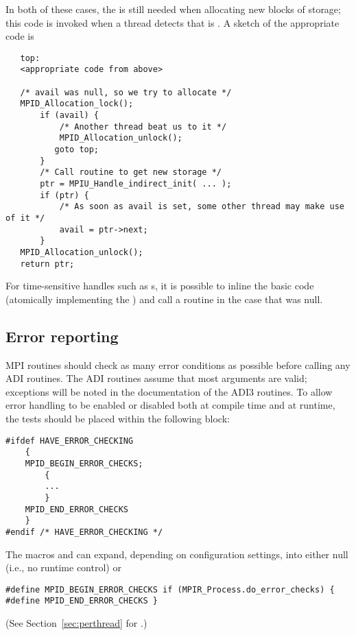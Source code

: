 \documentclass{article}
\begin{document}
In both of these cases, the  is still
needed when allocating new blocks of storage; this code is invoked when a
thread detects that  is .  A sketch of the appropriate
code is
\begin{verbatim}
   top:
   <appropriate code from above>

   /* avail was null, so we try to allocate */
   MPID_Allocation_lock();
       if (avail) {
           /* Another thread beat us to it */
           MPID_Allocation_unlock();
          goto top;
       }   
       /* Call routine to get new storage */
       ptr = MPIU_Handle_indirect_init( ... );
       if (ptr) {
           /* As soon as avail is set, some other thread may make use of it */
           avail = ptr->next;
       }
   MPID_Allocation_unlock();
   return ptr;
\end{verbatim}
For time-sensitive handles such as s, it is possible to
inline the basic code (atomically implementing the ) and call a routine in the case that  was
null.  

\subsection{Error reporting}
\label{sec:error-reporting}

MPI routines should check as many error conditions as possible before
calling any ADI routines.  The ADI routines assume that most arguments are
valid; exceptions will be noted in the documentation of the ADI3 routines.
To allow error handling to be enabled or disabled both at compile
time 
and at runtime, the tests should be placed within the following block:
\begin{verbatim}
#ifdef HAVE_ERROR_CHECKING
    {
    MPID_BEGIN_ERROR_CHECKS;
        {
        ...
        }
    MPID_END_ERROR_CHECKS
    }
#endif /* HAVE_ERROR_CHECKING */
\end{verbatim}
The macros  and  can
expand, depending on configuration settings, into either null (i.e.,
no runtime control) or 
\begin{verbatim}
#define MPID_BEGIN_ERROR_CHECKS if (MPIR_Process.do_error_checks) {
#define MPID_END_ERROR_CHECKS }
\end{verbatim}
(See Section~\ref{sec:perthread} for .)
\end{document}
